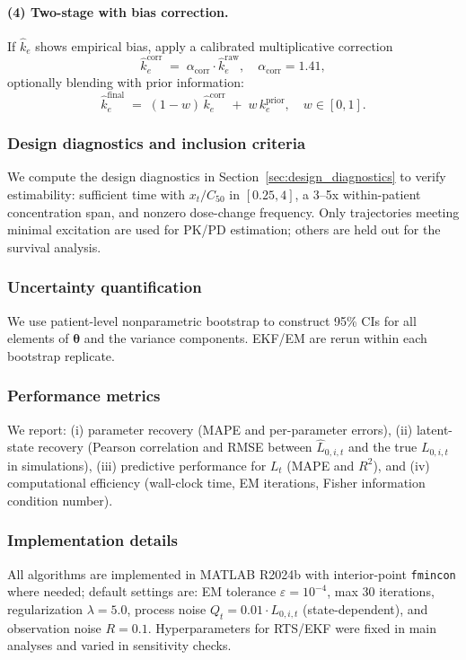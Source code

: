 \paragraph{(4) Two-stage with bias correction.}
If $\hat k_e$ shows empirical bias, apply a calibrated multiplicative correction
\[
\hat k_e^{\text{corr}} \;=\; \alpha_{\mathrm{corr}} \cdot \hat k_e^{\text{raw}}, 
\quad \alpha_{\mathrm{corr}} = 1.41,
\]
optionally blending with prior information:
\[
\hat k_e^{\text{final}} \;=\; (1-w)\,\hat k_e^{\text{corr}} \;+\; w\, k_e^{\text{prior}}, \quad w \in [0,1].
\]

\subsubsection*{Design diagnostics and inclusion criteria}
We compute the design diagnostics in Section~\ref{sec:design_diagnostics} to verify estimability: sufficient time with $x_t/C_{50}$ in $[0.25,4]$, a 3--5x within-patient concentration span, and nonzero dose-change frequency. Only trajectories meeting minimal excitation are used for PK/PD estimation; others are held out for the survival analysis. 

\subsubsection*{Uncertainty quantification}
We use patient-level nonparametric bootstrap to construct 95\% CIs for all elements of $\boldsymbol{\theta}$ and the variance components. EKF/EM are rerun within each bootstrap replicate.

\subsubsection*{Performance metrics}
We report:
(i) parameter recovery (MAPE and per-parameter errors), 
(ii) latent-state recovery (Pearson correlation and RMSE between $\hat L_{0,i,t}$ and the true $L_{0,i,t}$ in simulations),
(iii) predictive performance for $L_t$ (MAPE and $R^2$), and
(iv) computational efficiency (wall-clock time, EM iterations, Fisher information condition number).

\subsubsection*{Implementation details}
All algorithms are implemented in MATLAB R2024b with interior-point \texttt{fmincon} where needed; default settings are: EM tolerance $\varepsilon=10^{-4}$, max 30 iterations, regularization $\lambda=5.0$, process noise $Q_t = 0.01 \cdot L_{0,i,t}$ (state-dependent), and observation noise $R=0.1$. Hyperparameters for RTS/EKF were fixed in main analyses and varied in sensitivity checks.


